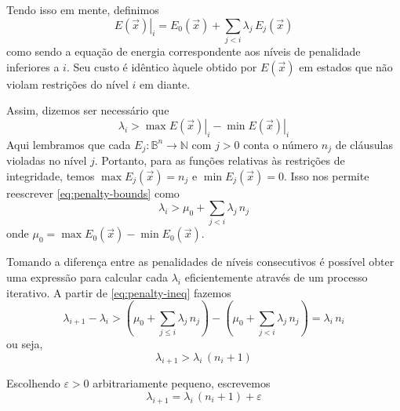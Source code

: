 Tendo isso em mente, definimos
\begin{equation}
    \left. E \left({ \vec{x} }\right)\right|_{i} = E_0 \left({ \vec{x} }\right) + \sum_{j < i} \lambda_{j}\, E_{j} \left({ \vec{x} }\right) \nonumber
\end{equation}
como sendo a equação de energia correspondente aos níveis de penalidade inferiores a $i$. Seu custo é idêntico àquele obtido por $E\left({\vec{x}}\right)$ em estados que não violam restrições do nível $i$ em diante.

Assim, dizemos ser necessário que
\begin{equation}
    \lambda_{i} > \max \left. E \left({ \vec{x} }\right)\right|_{i} - \min \left. E \left({ \vec{x} }\right)\right|_{i} \label{eq:penalty-bounds}
\end{equation}
Aqui lembramos que cada $E_j : \mathbb{B}^{n} \to \mathbb{N}$ com $j > 0$ conta o número $n_j$ de cláusulas violadas no nível $j$. Portanto, para as funções relativas às restrições de integridade, temos $\max E_j \left({ \vec{x} }\right) = n_j$ e $\min E_j \left({ \vec{x} }\right) = 0$. Isso nos permite reescrever \eqref{eq:penalty-bounds} como
\begin{equation}
    \lambda_{i} > \mu_0 + \sum_{j < i} \lambda_{j}\, n_j \label{eq:penalty-ineq}
\end{equation}
onde $\mu_0 = \max E_0 \left({ \vec{x} }\right) - \min E_0 \left({ \vec{x} }\right)$.

Tomando a diferença entre as penalidades de níveis consecutivos é possível obter uma expressão para calcular cada $\lambda_{i}$ eficientemente através de um processo iterativo. A partir de \eqref{eq:penalty-ineq} fazemos
\begin{equation}
    \lambda_{i + 1} - \lambda_{i} > \left({\mu_0 + \sum_{j \le i} \lambda_{j}\, n_j}\right) - \left({\mu_0 + \sum_{j < i} \lambda_{j}\, n_j}\right) = \lambda_{i}\,n_{i} \nonumber
\end{equation}
ou seja,
\begin{equation}
    \lambda_{i + 1} > \lambda_{i}\, (n_{i} + 1) \nonumber
\end{equation}

Escolhendo $\varepsilon > 0$ arbitrariamente pequeno, escrevemos
\begin{equation}
    \lambda_{i + 1} = \lambda_{i}\, (n_{i} + 1) + \varepsilon
\end{equation}

